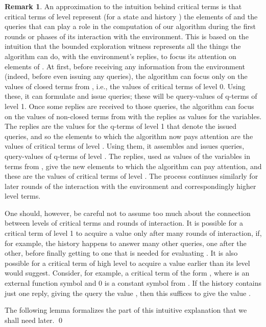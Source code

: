 \documentclass{LMCS}
\theoremstyle{definition}
\newtheorem{rmk}[thm]{Remark}
\begin{document}
\begin{rmk}
An approximation to the intuition behind critical terms is that critical
terms of level  represent (for a state  and history ) the
elements of  and the queries that can play a role in the computation of
our algorithm  during the first  rounds or phases of its interaction
with the environment.  This is based on the intuition that the bounded
exploration witness  represents all the things the algorithm can do,
with the environment's replies, to focus its attention on elements of .
At first, before receiving any information from the environment (indeed,
before even issuing any queries), the algorithm can focus only on the
values of closed terms from , i.e., the values of critical terms of
level 0.  Using these, it can formulate and issue queries; these will be
query-values of q-terms of level 1.  Once some replies are received to
those queries, the algorithm can focus on the values of non-closed terms
from  with the replies as values for the variables.  The replies are
the values for the q-terms of level 1 that denote the issued queries, and
so the elements to which the algorithm now pays attention are the values
of critical terms of level .  Using them, it assembles and issues
queries, query-values of q-terms of level . The replies, used as
values of the variables in terms from , give the new elements to which
the algorithm can pay attention, and these are the values of critical
terms of level .  The process continues similarly for later rounds
of the interaction with the environment and correspondingly higher level
terms.

One should, however, be careful not to assume too much about the
connection between levels of critical terms and rounds of
interaction. It is possible for a critical term  of level 1 to
acquire a value only after many rounds of interaction, if, for
example, the history happens to answer many other queries, one after
the other, before finally getting to one that is needed for evaluating
.  It is also possible for a critical term of high level to acquire
a value earlier than its level would suggest. Consider, for example, a
critical term of the form , where  is an external
function symbol and 0 is a constant symbol from .  If the
history  contains just one reply, giving the query 
the value , then this suffices to give  the value
.

The following lemma formalizes the part of this intuitive explanation
that we shall need later.
\qed\end{rmk}
\end{document}

